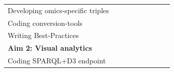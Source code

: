 \documentclass[twoside,fontsize=10pt]{article}
\begin{document}
\begin{center}
\begin{table}[h]
\begin{tabular}{lllllllll}
\hspace*{1em} Developing omics-specific triples & \cellcolor[HTML]{656565}                        &                                                 &                                                 &                                                 &                                                 &                                                 &                                                 &                                                 \\
\hspace*{1em} Coding conversion-tools           &                                                 & \cellcolor[HTML]{656565}                        & \cellcolor[HTML]{656565}                        &                                                 &                                                 &                                                 &                                                 &                                                 \\
\hspace*{1em} Writing Best-Practices            &                                                 &                                                 & \cellcolor[HTML]{656565}                        &                                                 &                                                 &                                                 &                                                 &                                                 \\
\textbf{Aim 2: Visual analytics}                &                                                 &                                                 & \cellcolor[HTML]{343434}                        & \cellcolor[HTML]{343434}                        &                                                 &                                                 &                                                 &                                                 \\
\hspace*{1em} Coding SPARQL+D3 endpoint         &                                                 &                                                 & \cellcolor[HTML]{656565}                        &                                                 &                                                 &                                                 &                                                 &                                                 \\

\end{tabular}
\end{table}
\end{center}
\end{document}
